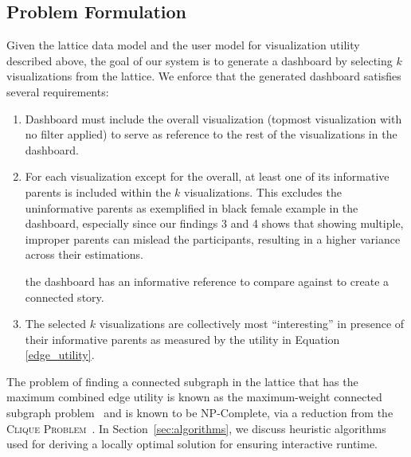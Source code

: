 \subsection{Problem Formulation}
Given the lattice data model and the user model for visualization utility described above, the goal of our system is to generate a dashboard by selecting $k$ visualizations from the lattice. We enforce that the generated dashboard satisfies several requirements:
 \begin{enumerate}
 	\item Dashboard must include the overall visualization (topmost visualization with no filter applied) to serve as reference to the rest of the visualizations in the dashboard.
 	\item For each visualization except for the overall, at least one of its informative parents is included within the $k$ visualizations. This excludes the uninformative parents as exemplified in black female example in the dashboard, especially since our findings 3 and 4 shows that showing multiple, improper parents can mislead the participants, resulting in a higher variance across their estimations. %

  the dashboard has an informative reference to compare against to create a connected story.
 	\item The selected $k$ visualizations are collectively most ``interesting'' in presence of their informative parents as measured by the utility in Equation \ref{edge_utility}.
\end{enumerate}
 The problem of finding a connected subgraph in the lattice that has the maximum combined edge utility is  known as the maximum-weight connected subgraph problem~\cite{ErnstAlthaus2009} and is known to be NP-Complete, via a reduction from the \textsc{Clique Problem}~\cite{Parameswaran2010}. In Section~\ref{sec:algorithms}, we discuss heuristic algorithms used for deriving a locally optimal solution for ensuring interactive runtime.
